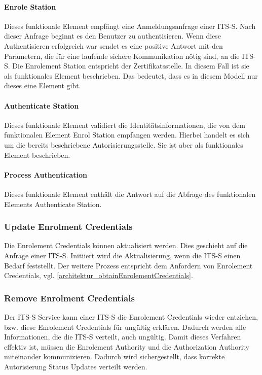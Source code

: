 \paragraph{Enrole Station} Dieses funktionale Element empfängt eine Anmeldungsanfrage einer \ac{ITS-S}. Nach dieser Anfrage beginnt es den Benutzer zu authentisieren. Wenn diese Authentisieren erfolgreich war sendet es eine positive Antwort mit den Parametern, die für eine laufende sichere Kommunikation nötig sind, an die \ac{ITS-S}. Die Enrolement Station entspricht der Zertifikatsstelle. In diesem Fall ist sie als funktionales Element beschrieben. Das bedeutet, dass es in diesem Modell nur dieses eine Element gibt. 

\paragraph{Authenticate Station} Dieses funktionale Element validiert die Identitätsinformationen, die von dem funktionalen Element Enrol Station empfangen werden. Hierbei handelt es sich um die bereits beschriebene Autorisierungsstelle. Sie ist aber als funktionales Element beschrieben.

\paragraph{Process Authentication} Dieses funktionale Element enthält die Antwort auf die Abfrage des funktionalen Elements  Authenticate Station.
 
 
\subsubsection{Update Enrolment Credentials}
Die Enrolement Credentials können aktualisiert werden. Dies geschieht auf die Anfrage einer \ac{ITS-S}. Initiiert wird die Aktualisierung, wenn die \ac{ITS-S}  einen Bedarf feststellt. Der weitere Prozess entspricht dem Anfordern von Enrolement Credentials, vgl. \autoref{architektur_obtainEnrolementCredentials}.

\subsubsection{Remove Enrolment Credentials}
Der \ac{ITS-S} Service kann einer \ac{ITS-S} die Enrolement Credentials wieder entziehen, bzw. diese Enrolement Credentials für ungültig erklären. Dadurch werden alle Informationen, die die \ac{ITS-S} verteilt, auch ungültig. Damit dieses Verfahren effektiv ist, müssen die Enrolement Authority und die Authorization Authority miteinander kommunizieren. Dadurch wird sichergestellt, dass korrekte Autorisierung Status Updates verteilt werden. 


